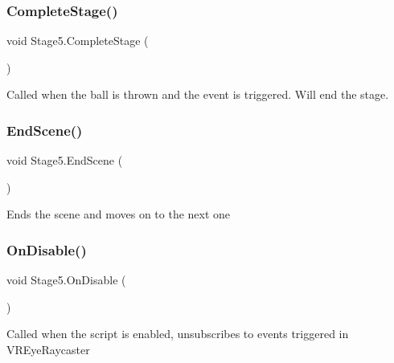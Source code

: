 \subsubsection{\texorpdfstring{Complete\+Stage()}{CompleteStage()}}
{\footnotesize\ttfamily void Stage5.\+Complete\+Stage (\begin{DoxyParamCaption}{ }\end{DoxyParamCaption})\hspace{0.3cm}{\ttfamily [private]}}



Called when the ball is thrown and the event is triggered. Will end the stage. 

\mbox{\label{class_stage5_a648d6f5b7fe35e437694c010f8b4704f}} 
\subsubsection{\texorpdfstring{End\+Scene()}{EndScene()}}
{\footnotesize\ttfamily void Stage5.\+End\+Scene (\begin{DoxyParamCaption}{ }\end{DoxyParamCaption})\hspace{0.3cm}{\ttfamily [private]}}



Ends the scene and moves on to the next one 

\mbox{\label{class_stage5_afd72a075c088e399a206482e8be39cce}} 
\subsubsection{\texorpdfstring{On\+Disable()}{OnDisable()}}
{\footnotesize\ttfamily void Stage5.\+On\+Disable (\begin{DoxyParamCaption}{ }\end{DoxyParamCaption})\hspace{0.3cm}{\ttfamily [private]}}



Called when the script is enabled, unsubscribes to events triggered in V\+R\+Eye\+Raycaster 

\mbox{\label{class_stage5_ac5bc96024542fdf588a18a7e6de7892f}} 
